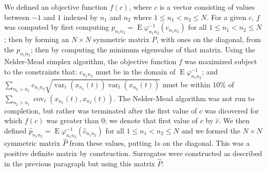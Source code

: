 \documentclass[letterpaper,11pt]{article}
\newcommand{\E}{\operatorname{E}}
\newcommand{\var}{\operatorname{var}}
\newcommand{\cov}{\operatorname{cov}}
\begin{document}
We defined an objective function $f(c)$, where $c$ is a vector consisting of 
values between $-1$ and $1$ indexed by
$n_1$ and $n_2$ where $1 \leq n_1 < n_2 \leq N$. For a given $c$, $f$ was
computed by first computing $p_{n_1 n_2}=\E\varphi_{n_1 n_2}^{-1}(c_{n_1 n_2})$
for all $1 \leq n_1 < n_2 \leq N$; then by forming an $N \times N$ symmetric 
matrix $P$, with ones on the diagonal, from the $p_{n_1 n_2}$; then by computing
the minimum eigenvalue of that matrix. Using the Nelder-Mead simplex algorithm, the 
objective function $f$ was maximized subject to the constraints that: 
$c_{n_1 n_2}$ must be in the domain of $\E\varphi_{n_1 n_2}^{-1}$; and
$\sum_{n_2>n_1} c_{n_1 n_2} \sqrt{\var_t(x_{n_1}(t)) \var_t(x_{n_2}(t))}$ must be 
within $10\%$ of $\sum_{n_2>n_1} \cov_t(x_{n_1}(t),x_{n_2}(t))$.
The Nelder-Mead algorithm was not run to completion, but rather was terminated 
after the first value of $c$ was dicovered for which $f(c)$ was greater than $0$;
we denote that first value of $c$ by $\hat{c}$. We then defined 
$\hat{p}_{n_1 n_2}=\E\varphi_{n_1 n_2}^{-1}(\hat{c}_{n_1 n_2})$
for all $1 \leq n_1 < n_2 \leq N$ and we formed the $N \times N$ symmetric matrix 
$\hat{P}$ from these values, putting $1$s on the diagonal. This was a 
positive definite matrix by construction. Surrogates were constructed as 
described in the previous paragraph but using this matrix $\hat{P}$.



\end{document}
